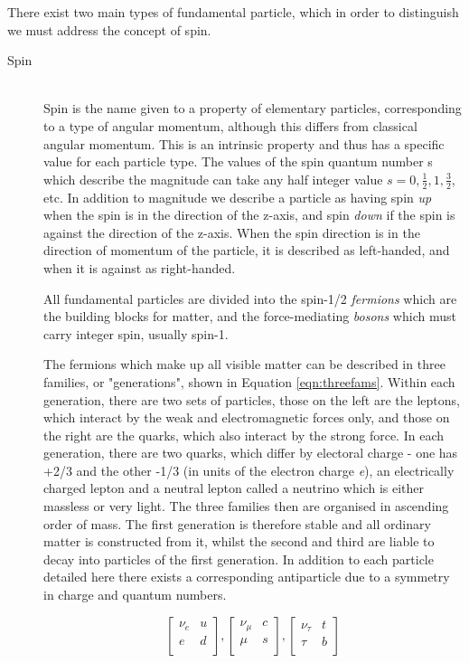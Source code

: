 There exist two main types of fundamental particle, which in order to distinguish we must address the concept of spin. 
\begin{description}
\item[Spin] \hfill \\
Spin is the name given to a property of elementary particles, corresponding to a type of angular momentum, although this differs from classical angular momentum. This is an intrinsic property and thus has a specific value for each particle type. The values of the spin quantum number s which describe the magnitude can take any half integer value $s=0, \frac{1}{2}, 1, \frac{3}{2}$, etc. In addition to magnitude we describe a particle as having spin \textit{up} when the spin is in the direction of the z-axis, and spin \textit{down} if the spin is against the direction of the z-axis. When the spin direction is in the direction of momentum of the particle, it is described as left-handed, and when it is against as right-handed. 

All fundamental particles are divided into the spin-1/2 \textit{fermions} which are the building blocks for matter, and the force-mediating \textit{bosons} which must carry integer spin, usually spin-1. 
 

 
The fermions which make up all visible matter can be described in three families, or "generations", shown in Equation \ref{eqn:threefams}. Within each generation, there are two sets of particles, those on the left are the leptons, which interact by the weak and electromagnetic forces only, and those on the right are the quarks, which also interact by the strong force. In each generation, there are two quarks, which differ by electoral charge - one has +2/3 and the other -1/3 (in units of the electron charge \textit{e}), an electrically charged lepton and a neutral lepton called a neutrino which is either massless or very light. The three families then are organised in ascending order of mass. The first generation is therefore stable and all ordinary matter is constructed from it, whilst the second and third are liable to decay into particles of the first generation. In addition to each particle detailed here there exists a corresponding antiparticle due to a symmetry in charge and quantum numbers.  

\begin{equation}
\begin{bmatrix}
\nu_{e} & u \\
e & d \\
\end{bmatrix},
\begin{bmatrix}
\nu_{\mu} & c \\
\mu & s \\
\end{bmatrix},
\begin{bmatrix}
\nu_{\tau} & t \\
\tau & b\\
\end{bmatrix}
\label{eqn:threefams}
\end{equation}

\end{description}
